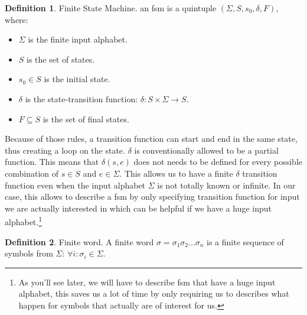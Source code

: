 \documentclass[12pt]{article}
\theoremstyle{definition}
\newtheorem{definition}{Definition}[section]
\theoremstyle{definition}
\theoremstyle{remark}
\newcommand{\A}{\mathcal{A}}
\begin{document}
\theoremstyle{definition}
\begin{definition}{Finite State Machine.} an \gls{fsm} is a quintuple $(\Sigma, S, s_{0},\delta, F)$, where:
\begin{itemize}
\item $\Sigma$ is the finite input alphabet.
\item $S$ is the set of states.
\item $s_{0} \in S$ is the initial state.
\item $\delta$ is the state-transition function: $\delta: S \times \Sigma \to S$.
\item $F \subseteq S$ is the set of final states.
\end{itemize}
\end{definition}

Because of those rules, a transition function can start and end in the same state, thus creating a loop on the state. $\delta$ is conventionally allowed to be a partial function. This means that $\delta(s, e)$ does not needs to be defined for every possible combination of $s \in S$ and $e \in \Sigma$. This allows us to have a finite $\delta$ transition function even when the input alphabet $\Sigma$ is not totally known or infinite. In our case, this allows to describe a \gls{fsm} by only specifying transition function for input we are actually interested in which can be helpful if we have a huge input alphabet.\footnote{As you'll see later, we will have to describe \gls{fsm} that have a huge input alphabet, this saves us a lot of time by only requiring us to describes what happen for symbols that actually are of interest for us.}


\theoremstyle{definition}
\begin{definition}{Finite word.} A finite word $\sigma = \sigma_1 \sigma_2 ... \sigma_n$ is a finite sequence of symbols from $\Sigma$: $\forall i: \sigma_i \in \Sigma$.
\end{definition}

\end{document}

